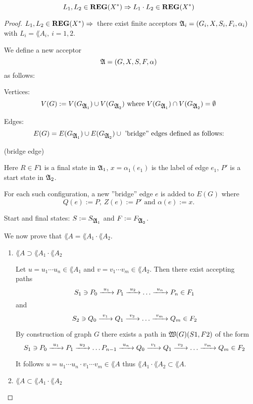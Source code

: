 \bigskip
\begin{theorem}
\[ L_1, L_2 \in \mbox{{\bf REG}}(X^*) \Rightarrow L_1 \cdot L_2 \in \mbox{{\bf REG}}(X^*) \]
\end{theorem}

\begin{proof}
$L_1, L_2 \in \mbox{{\bf REG}}(X^*) \Rightarrow$\ there exist finite acceptors
$\mbox{$\mathfrak{A}$}_i = (G_i, X, S_i, F_i, \alpha_i)$ with $L_i = \lang{A}_i,\ i = 1,2$.

We define a new acceptor
\[\mbox{$\mathfrak{A}$} = (G, X, S, F, \alpha) \]
as follows:

Vertices:
\[ V(G) := V(G_{\mbox{$\mathfrak{A}$}_1}) \cup V(G_{\mbox{$\mathfrak{A}$}_2})\mbox{ where }V(G_{\mbox{$\mathfrak{A}$}_1})
\cap V(G_{\mbox{$\mathfrak{A}$}_2}) = \emptyset \]

Edges:
\[ E(G) = E(G_{\mbox{$\mathfrak{A}$}_1}) \cup E(G_{\mbox{$\mathfrak{A}$}_2}) \cup \mbox{ 'bridge'' edges
defined as follows:}
\]

\missingfigure (bridge edge)

Here $R \in F1$ is a final state in $\mbox{$\mathfrak{A}$}_1$, $x = \alpha_1(e_1)$ is the label
of edge $e_1$, $P'$ is a start state in $\mbox{$\mathfrak{A}$}_2$.

For each such configuration, a new ''bridge''	edge $e$ is added to $E(G)$ where
\[ Q(e) := P,\ Z(e) := P' \mbox{ and } \alpha(e) := x.\]

Start and final states: $S := S_{\mbox{$\mathfrak{A}$}_1}$ and $F := F_{\mbox{$\mathfrak{A}$}_2}$.

We now prove that $\lang{A} = \lang{A}_1 \cdot \lang{A}_2$.

\begin{enumerate}
  \item $\lang{A} \supset \lang{A}_1 \cdot \lang{A}_2$
  
  Let $u = u_1 \cdots u_n \in \lang{A}_1$ and $v = v_1 \cdots v_m \in
  \lang{A}_2$. Then there exist accepting paths
  \[ S_1 \ni P_0 \xrightarrow{\ {u_1}\ } P_1 \xrightarrow{\ {u_2}\ } \ldots \xrightarrow{\ {u_n}\ } P_n \in F_1 \]
  and 
  \[ S_2 \ni Q_0 \xrightarrow{\ {v_1}\ } Q_1 \xrightarrow{\ {v_2}\ } \ldots \xrightarrow{\ {v_m}\ } Q_m \in F_2 \]
  
  By construction of graph $G$ there exists a path in $\mbox{$\mathfrak{W}({G})$}(S1, F2)$ of
  the form
  \[ S_1 \ni P_0 \xrightarrow{\ {u_1}\ } P_1 \xrightarrow{\ {u_2}\ } \ldots P_{n-1} \xrightarrow{\ {u_n}\ } Q_0
  \xrightarrow{\ {v_1}\ } Q_1 \xrightarrow{\ {v_2}\ } \ldots \xrightarrow{\ {v_m}\ } Q_m \in F_2 \]
  
  It follows $u = u_1 \cdots u_n \cdot v_1 \cdots v_m \in \lang{A}$ thus
  $\lang{A}_1 \cdot \lang{A}_2 \subset \lang{A}$.
  
  \item $\lang{A} \subset \lang{A}_1 \cdot \lang{A}_2$
  

\end{enumerate}
\end{proof}
